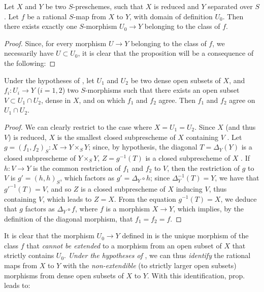\begin{prop}[7.2.2]
\label{1.7.2.2}
Let
$X$ and $Y$ be two $S$-preschemes, such that $X$ is reduced and $Y$ separated over $S$.
Let $f$ be a rational $S$-map from $X$ to $Y$, with domain of definition $U_0$.
Then there exists exactly one $S$-morphism $U_0\to Y$ belonging to the class of $f$.
\end{prop}

\begin{proof}
\label{proof-1.7.2.2}
Since, for every morphism $U\to Y$ belonging to the class of $f$, we necessarily have $U\subset U_0$, it is clear that the proposition will be a consequence of the following:
\end{proof}

\begin{lem}[7.2.2.1]
\label{1.7.2.2.1}
Under the hypotheses of , let $U_1$ and $U_2$ be two dense open subsets of $X$, and $f_i:U_i\to Y$ ($i=1,2$) two $S$-morphisms such that there exists an open subset $V\subset U_1\cap U_2$, dense in $X$, and on which $f_1$ and $f_2$ agree.
Then $f_1$ and $f_2$ agree on $U_1\cap U_2$.
\end{lem}

\begin{proof}
\label{proof-1.7.2.2.1}
We can clearly restrict to the case where $X=U_1=U_2$.
Since $X$ (and thus $V$) is reduced, $X$ is the smallest closed subprescheme of $X$ containing $V$ .
Let $g=(f_1,f_2)_S:X\to Y\times_S Y$; since, by hypothesis, the diagonal $T=\Delta_Y(Y)$ is a closed subprescheme of $Y\times_S Y$, $Z=g^{-1}(T)$ is a closed subprescheme of $X$ .
If $h:V\to Y$ is the common restriction of $f_1$ and $f_2$ to $V$, then the restriction of $g$ to $V$ is $g'=(h,h)_S$, which factors as $g'=\Delta_Y\circ h$; since $\Delta_Y^{-1}(T)=Y$, we have that $g'^{-1}(T)=V$, and so $Z$ is a closed subprescheme of $X$ inducing $V$, thus containing $V$, which leads to $Z=X$.
From the equation $g^{-1}(T)=X$, we deduce  that $g$ factors as $\Delta_Y\circ f$, where $f$ is a morphism $X\to Y$, which implies, by the definition of the diagonal morphism, that $f_1=f_2=f$.
\end{proof}

It is clear that the morphism $U_0\to Y$ defined in  is the unique morphism of the class $f$ that \emph{cannot be extended} to a morphism from an open subset of $X$ that strictly contains $U_0$.
\emph{Under the hypotheses of }, we can thus \emph{identify} the rational maps from $X$ to $Y$ with the \emph{non-extendible} (to strictly larger open subsets) morphisms from dense open subsets of $X$ to $Y$.
With this identification, prop.~ leads to:

